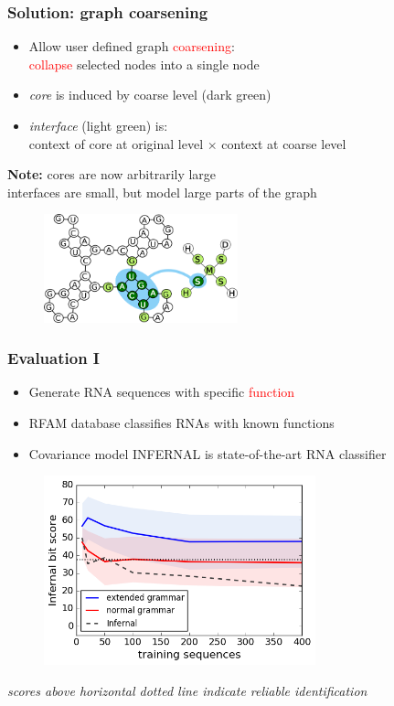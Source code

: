 \documentclass{beamer}
\newcommand{\red}[1]{\textcolor{red}{#1}}
\begin{document}
\begin{frame}
    \frametitle{Solution: graph coarsening}
    \begin{itemize}
        \item Allow user defined graph \red{coarsening}:\\
        \red{collapse} selected nodes into a single node
        \item {\em core} is induced by coarse level (dark green)
        \item {\em interface} (light green) is: \\context of core at original level $\times$ context at coarse level
   \end{itemize}
    {\bf Note:} cores are now arbitrarily large\\
    interfaces are small, but model large parts of the graph
   \begin{figure}[ht]
        \centering
        \includegraphics[width=0.50\textwidth]{images/nucip.png}
    \end{figure}
   
\end{frame}





\begin{frame}
    \frametitle{Evaluation I}
    \begin{itemize}
        \item Generate RNA sequences with specific \red{function}
        \item RFAM database classifies RNAs with known functions
        \item Covariance model INFERNAL is state-of-the-art RNA classifier 
    \end{itemize}

   \begin{figure}[ht]
        \centering
        \includegraphics[width=0.70\textwidth]{images/infernal_abstr.png}
    \end{figure}
   \small{\em scores above horizontal dotted line indicate reliable identification}
\end{frame}
\end{document}
